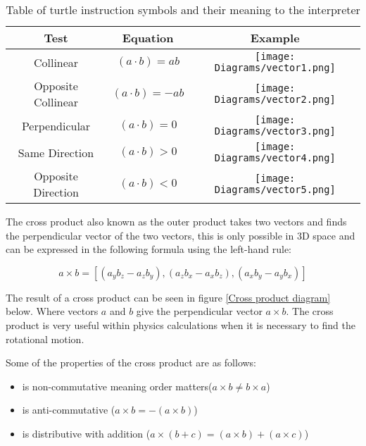 \begin{table}[h!]
\centering
\begin{tabular}{ | c | c | c |}
\hline
	Test 	& Equation & Example\\  
\hline
\hline
	Collinear 							& $(a \cdot b) = ab$ & \texttt{[image: Diagrams/vector1.png]}\\
\hline
	Opposite Collinear 					& $(a \cdot b) = -ab$ &	\texttt{[image: Diagrams/vector2.png]}\\
\hline
	Perpendicular 						& $(a \cdot b) = 0$	&\texttt{[image: Diagrams/vector3.png]}\\
\hline
	Same Direction 						& $(a \cdot b) > 0$ &\texttt{[image: Diagrams/vector4.png]}\\
\hline
	Opposite Direction 					& $(a \cdot b) < 0$ &\texttt{[image: Diagrams/vector5.png]}\\
\hline

\end{tabular}
\caption{Table of turtle instruction symbols and their meaning to the interpreter}
\label{dot product test}
\end{table}
\FloatBarrier

\noindent
The cross product also known as the outer product takes two vectors and finds the perpendicular vector of the two vectors, this is only possible in 3D space and can be expressed in the following formula using the left-hand rule: 

\begin{equation}
a \times b = [(a_y b_z - a_z b_y), (a_z b_x - a_x b_z), (a_x b_y - a_y b_x)]
\end{equation}

\noindent
The result of a cross product can be seen in figure \ref{Cross product diagram} below. Where vectors $a$ and $b$ give the perpendicular vector $a \times b$. The cross product is very useful within physics calculations when it is necessary to find the rotational motion. 

\noindent
Some of the properties of the cross product are as follows:

\begin{itemize}
	\item is non-commutative meaning order matters($a \times b \not= b \times a$)
	\item is anti-commutative ($a \times b = -(a \times b)$)
	\item is distributive with addition ($a \times (b + c) = (a \times b) + (a \times c)$)
\end{itemize}

